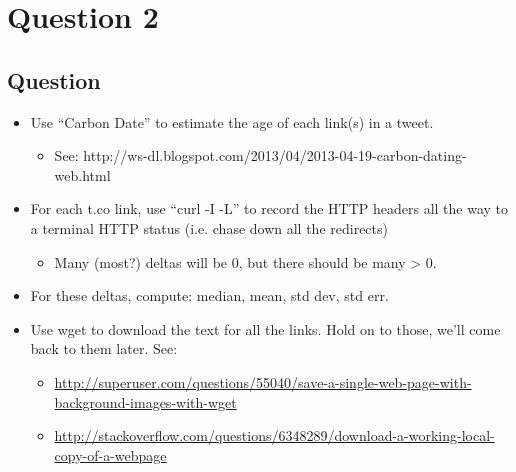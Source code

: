 \chapter{Question 2}
\label{question-2}
\section{Question}



\begin{itemize}
\item Use ``Carbon Date'' to estimate the age of each link(s) in a tweet.
	\begin{itemize}
	\item See: http://ws-dl.blogspot.com/2013/04/2013-04-19-carbon-dating-web.html
	\end{itemize}
\item For each t.co link, use ``curl -I -L'' to record the HTTP headers all the way to a terminal HTTP status (i.e. chase down all the redirects)
	\begin{itemize}
	\item Many (most?) deltas will be 0, but there should be many > 0.	
	\end{itemize}
\item For these deltas, compute: median, mean, std dev, std err.	
\item Use wget to download the text for all the links.  Hold on to those, we’ll come back to them later. See:
	\begin{itemize}
	\item \hyperref[savePage]{http://superuser.com/questions/55040/save-a-single-web-page-with-background-images-with-wget}
	\item \hyperref[copyPage]{http://stackoverflow.com/questions/6348289/download-a-working-local-copy-of-a-webpage}
	\end{itemize}
\end{itemize}

